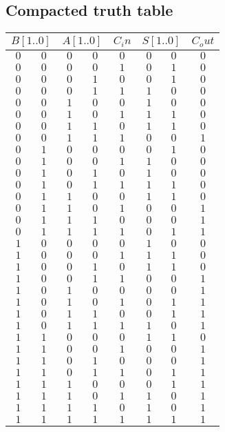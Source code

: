 \documentclass [15pt,a4paper,twoside]{article}
\begin{document}
\subsection{Compacted truth table}
\begin{center}
\begin{tabular}{ccccc|ccc}
\multicolumn{2}{c}{$B[1..0]$}&\multicolumn{2}{c}{$A[1..0]$}&$C_in$&\multicolumn{2}{c}{$S[1..0]$}&$C_out$\\
\hline
$0$&$0$&$0$&$0$&$0$&$0$&$0$&$0$\\
$0$&$0$&$0$&$0$&$1$&$0$&$1$&$0$\\
$0$&$0$&$0$&$1$&$0$&$0$&$1$&$0$\\
$0$&$0$&$0$&$1$&$1$&$1$&$0$&$0$\\
$0$&$0$&$1$&$0$&$0$&$1$&$0$&$0$\\
$0$&$0$&$1$&$0$&$1$&$1$&$1$&$0$\\
$0$&$0$&$1$&$1$&$0$&$1$&$1$&$0$\\
$0$&$0$&$1$&$1$&$1$&$0$&$0$&$1$\\
$0$&$1$&$0$&$0$&$0$&$0$&$1$&$0$\\
$0$&$1$&$0$&$0$&$1$&$1$&$0$&$0$\\
$0$&$1$&$0$&$1$&$0$&$1$&$0$&$0$\\
$0$&$1$&$0$&$1$&$1$&$1$&$1$&$0$\\
$0$&$1$&$1$&$0$&$0$&$1$&$1$&$0$\\
$0$&$1$&$1$&$0$&$1$&$0$&$0$&$1$\\
$0$&$1$&$1$&$1$&$0$&$0$&$0$&$1$\\
$0$&$1$&$1$&$1$&$1$&$0$&$1$&$1$\\
$1$&$0$&$0$&$0$&$0$&$1$&$0$&$0$\\
$1$&$0$&$0$&$0$&$1$&$1$&$1$&$0$\\
$1$&$0$&$0$&$1$&$0$&$1$&$1$&$0$\\
$1$&$0$&$0$&$1$&$1$&$0$&$0$&$1$\\
$1$&$0$&$1$&$0$&$0$&$0$&$0$&$1$\\
$1$&$0$&$1$&$0$&$1$&$0$&$1$&$1$\\
$1$&$0$&$1$&$1$&$0$&$0$&$1$&$1$\\
$1$&$0$&$1$&$1$&$1$&$1$&$0$&$1$\\
$1$&$1$&$0$&$0$&$0$&$1$&$1$&$0$\\
$1$&$1$&$0$&$0$&$1$&$0$&$0$&$1$\\
$1$&$1$&$0$&$1$&$0$&$0$&$0$&$1$\\
$1$&$1$&$0$&$1$&$1$&$0$&$1$&$1$\\
$1$&$1$&$1$&$0$&$0$&$0$&$1$&$1$\\
$1$&$1$&$1$&$0$&$1$&$1$&$0$&$1$\\
$1$&$1$&$1$&$1$&$0$&$1$&$0$&$1$\\
$1$&$1$&$1$&$1$&$1$&$1$&$1$&$1$\\

\end{tabular}
\end{center}
\end{document}
